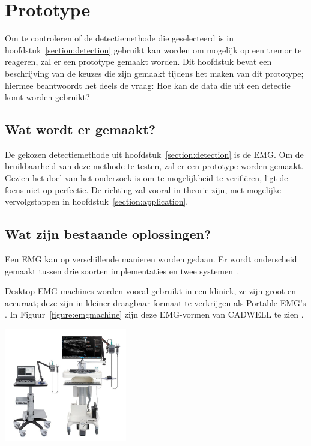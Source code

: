\section{Prototype}
\label{section:prototyping}

Om te controleren of de detectiemethode die geselecteerd is in hoofdstuk~\ref{section:detection}
gebruikt kan worden om mogelijk op een tremor te reageren,
zal er een prototype gemaakt worden.
Dit hoofdstuk bevat een beschrijving van de keuzes die zijn gemaakt tijdens het maken van dit prototype;
hiermee beantwoordt het deels de vraag: Hoe kan de data die uit een detectie komt worden gebruikt?

\subsection{Wat wordt er gemaakt?}

De gekozen detectiemethode uit hoofdstuk~\ref{section:detection} is de EMG.
Om de bruikbaarheid van deze methode te testen, zal er een prototype worden gemaakt.
Gezien het doel van het onderzoek is om te mogelijkheid te verifiëren, ligt de focus niet op perfectie.
De richting zal vooral in theorie zijn, met mogelijke vervolgstappen in hoofdstuk~\ref{section:application}.

\subsection{Wat zijn bestaande oplossingen?}

Een EMG kan op verschillende manieren worden gedaan. 
Er wordt onderscheid gemaakt tussen drie soorten implementaties en twee systemen \cite{gohel2020}.

Desktop EMG-machines worden vooral gebruikt in een kliniek, ze zijn groot en accuraat;
deze zijn in kleiner draagbaar formaat te verkrijgen als Portable EMG's \cite{neurostyle2021,cadwell2023}.
In Figuur~\ref{figure:emgmachine} zijn deze EMG-vormen van CADWELL te zien \cite{cadwell2023}.

\begin{center}
    \includegraphics[width=0.4\textwidth]{./graphics/img-emgcarts.jpg}
    \label{figure:emgmachine}
\end{center}

